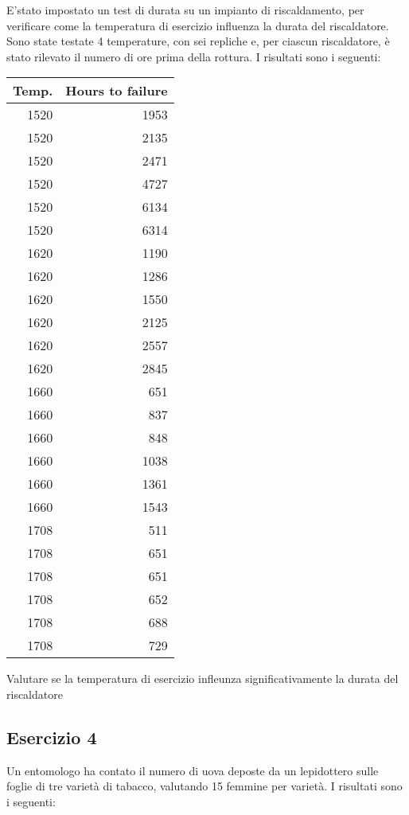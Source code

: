 \documentclass[a4paper,12pt,oneside]{book}
\begin{document}
E'stato impostato un test di durata su un impianto di riscaldamento, per verificare come la temperatura di esercizio influenza la durata del riscaldatore. Sono state testate 4 temperature, con sei repliche e, per ciascun riscaldatore, è stato rilevato il numero di ore prima della rottura. I risultati sono i seguenti:

\begin{longtable}[]{@{}rr@{}}
\toprule
Temp. & Hours to failure \\
\midrule
\endhead
1520 & 1953 \\
1520 & 2135 \\
1520 & 2471 \\
1520 & 4727 \\
1520 & 6134 \\
1520 & 6314 \\
1620 & 1190 \\
1620 & 1286 \\
1620 & 1550 \\
1620 & 2125 \\
1620 & 2557 \\
1620 & 2845 \\
1660 & 651 \\
1660 & 837 \\
1660 & 848 \\
1660 & 1038 \\
1660 & 1361 \\
1660 & 1543 \\
1708 & 511 \\
1708 & 651 \\
1708 & 651 \\
1708 & 652 \\
1708 & 688 \\
1708 & 729 \\
\bottomrule
\end{longtable}

Valutare se la temperatura di esercizio infleunza significativamente la durata del riscaldatore

\hypertarget{esercizio-4-3}{%
\subsection{Esercizio 4}\label{esercizio-4-3}}

Un entomologo ha contato il numero di uova deposte da un lepidottero sulle foglie di tre varietà di tabacco, valutando 15 femmine per varietà. I risultati sono i seguenti:
\end{document}
